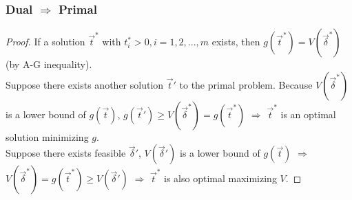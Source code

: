 \documentclass[11pt,a4paper]{article}
\newtheorem{theorem}{Theorem}
\begin{document}
\subsubsection*{Dual $\Rightarrow$ Primal}
\begin{center}
\end{center}
\begin{proof}
    If a solution $\vec{t}^*$ with $t^*_i>0,i=1,2,...,m$ exists, then $g(\vec{t}^*)=V(\vec{\delta}^*)$ (by A-G inequality).\\
    Suppose there exists another solution $\vec{t}'$ to the primal problem. Because $V(\vec{\delta}^*)$ is a lower bound of $g(\vec{t})$, $g(\vec{t}')\geq V(\vec{\delta}^*)=g(\vec{t}^*)$ $\Rightarrow$ $\vec{t}^*$ is an optimal solution minimizing $g$.\\
    Suppose there exists feasible $\vec{\delta}'$, $V(\vec{\delta}')$ is a lower bound of $g(\vec{t})$ $\Rightarrow$ $V(\vec{\delta}^*)=g(\vec{t}^*)\geq V(\vec{\delta}')$ $\Rightarrow$ $\vec{t}^*$ is also optimal maximizing $V$.
\end{proof}
\end{document}
